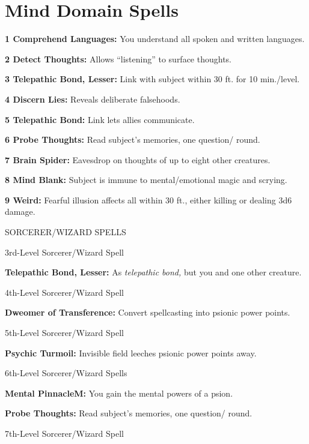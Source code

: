 \documentclass{article}
\begin{document}
\section*{\textbf{Mind Domain Spells}}

\textbf{1 Comprehend Languages: }You understand all spoken and written languages.

\textbf{2 Detect Thoughts:} Allows ``listening'' to surface thoughts.

\textbf{3 Telepathic Bond, Lesser:} Link with subject within 30 ft. for 10 min./level.

\textbf{4 Discern Lies:} Reveals deliberate falsehoods.

\textbf{5 Telepathic Bond: }Link lets allies communicate.

\textbf{6 Probe Thoughts:} Read subject's memories, one question/ round.

\textbf{7 Brain Spider:} Eavesdrop on thoughts of up to eight other creatures.

\textbf{8 Mind Blank:} Subject is immune to mental/emotional magic and scrying.

\textbf{9 Weird:} Fearful illusion affects all within 30 ft., either killing or 
dealing 3d6 damage.

\vspace{12pt}
SORCERER/WIZARD SPELLS

\vspace{12pt}
3rd-Level Sorcerer/Wizard Spell

\textbf{Telepathic Bond, Lesser:} As \textit{telepathic bond, }but you and one 
other creature.

\vspace{12pt}
4th-Level Sorcerer/Wizard Spell

\textbf{Dweomer of Transference: }Convert spellcasting into psionic power points.

\vspace{12pt}
5th-Level Sorcerer/Wizard Spell

\textbf{Psychic Turmoil:} Invisible field leeches psionic power points away.

\vspace{12pt}
6th-Level Sorcerer/Wizard Spells

\textbf{Mental Pinnacle}{\scriptsize{}\textbf{M}}\textbf{:} You gain the mental 
powers of a psion. 

\textbf{Probe Thoughts:} Read subject's memories, one question/ round.

\vspace{12pt}
7th-Level Sorcerer/Wizard Spell
\end{document}
